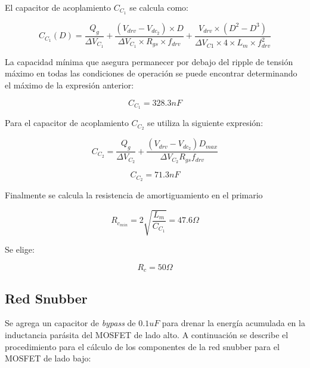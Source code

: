 El capacitor de acoplamiento $C_{C_1}$ se calcula como:

$$ C_{C_1}(D)=\frac{Q_g}{\Delta V_{C_1}}+\frac{(V_{drv}-V_{{dc}_2})\times D}{\Delta V_{C_1}\times R_{gs}\times f_{drv}}+\frac{V_{drv}\times (D^2-D^3)}{\Delta V_{C1}\times 4\times L_m\times f_{drv}^2} $$

La capacidad mínima que asegura permanecer por debajo del ripple de tensión máximo en todas las condiciones de operación 
se puede encontrar determinando el máximo de la expresión anterior:

$$ C_{C_1}=328.3nF $$

Para el capacitor de acoplamiento $C_{C_2}$ se utiliza la siguiente expresión:

$$ C_{C_2}=\frac{Q_g}{\Delta V_{C_2}}+\frac{(V_{drv}-V_{dc_2})D_{max}}{\Delta V_{C_2}R_{gs}f_{drv}} $$

$$ C_{C_2}=71.3nF $$

Finalmente se calcula la resistencia de amortiguamiento en el primario

$$ R_{c_{min}}=2\sqrt{\frac{L_m}{C_{C_1}}}=47.6\Omega $$

Se elige:

$$ R_c=50\Omega $$

\subsection{Red Snubber}

Se agrega un capacitor de \textit{bypass} de $0.1uF$ para drenar la energía acumulada en la inductancia parásita del MOSFET de lado alto.   
A continuación se describe el procedimiento para el cálculo de los componentes de la red snubber para el MOSFET de lado bajo:

